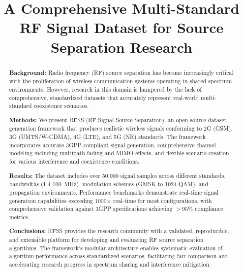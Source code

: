 \documentclass[conference]{IEEEtran}
\begin{document}
\title{A Comprehensive Multi-Standard RF Signal Dataset for Source Separation Research}

\author{
}

\maketitle

\begin{abstract}
\textbf{Background:} Radio frequency (RF) source separation has become increasingly critical with the proliferation of wireless communication systems operating in shared spectrum environments. However, research in this domain is hampered by the lack of comprehensive, standardized datasets that accurately represent real-world multi-standard coexistence scenarios.

\textbf{Methods:} We present RFSS (RF Signal Source Separation), an open-source dataset generation framework that produces realistic wireless signals conforming to 2G (GSM), 3G (UMTS/W-CDMA), 4G (LTE), and 5G (NR) standards. The framework incorporates accurate 3GPP-compliant signal generation, comprehensive channel modeling including multipath fading and MIMO effects, and flexible scenario creation for various interference and coexistence conditions.

\textbf{Results:} The dataset includes over 50,000 signal samples across different standards, bandwidths (1.4-100~MHz), modulation schemes (GMSK to 1024-QAM), and propagation environments. Performance benchmarks demonstrate real-time signal generation capabilities exceeding 1000$\times$ real-time for most configurations, with comprehensive validation against 3GPP specifications achieving $>95\%$ compliance metrics.

\textbf{Conclusions:} RFSS provides the research community with a validated, reproducible, and extensible platform for developing and evaluating RF source separation algorithms. The framework's modular architecture enables systematic evaluation of algorithm performance across standardized scenarios, facilitating fair comparison and accelerating research progress in spectrum sharing and interference mitigation.
\end{abstract}
\end{document}
